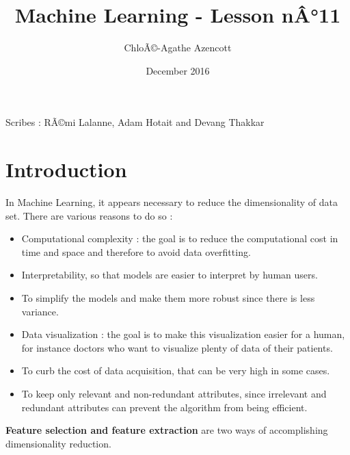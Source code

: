 \documentclass{article}
\title{Machine Learning - Lesson nÂ°11}
\author{ChloÃ©-Agathe Azencott}
\date{December 2016}
\begin{document}
\maketitle

Scribes : RÃ©mi Lalanne, Adam Hotait and Devang Thakkar

\section{Introduction}
In Machine Learning, it appears necessary to reduce the dimensionality of data set. There are various reasons to do so :

\begin{itemize}
    \item Computational complexity : the goal is to reduce the computational cost in time and space and therefore to avoid data overfitting.
    
    \item Interpretability, so that models are easier to interpret by human users.
    
    \item To simplify the models and make them more robust since there is less variance.
    
    \item Data visualization : the goal is to make this visualization easier for a human, for instance doctors who want to visualize plenty of data of their patients.
    
    \item To curb the cost of data acquisition, that can be very high in some cases.
    
    \item To keep only relevant and non-redundant attributes, since irrelevant and redundant attributes can prevent the algorithm from being efficient.
    
\end{itemize}

\bigskip

\textbf{Feature selection and feature extraction} are two ways of accomplishing dimensionality reduction.
\end{document}
